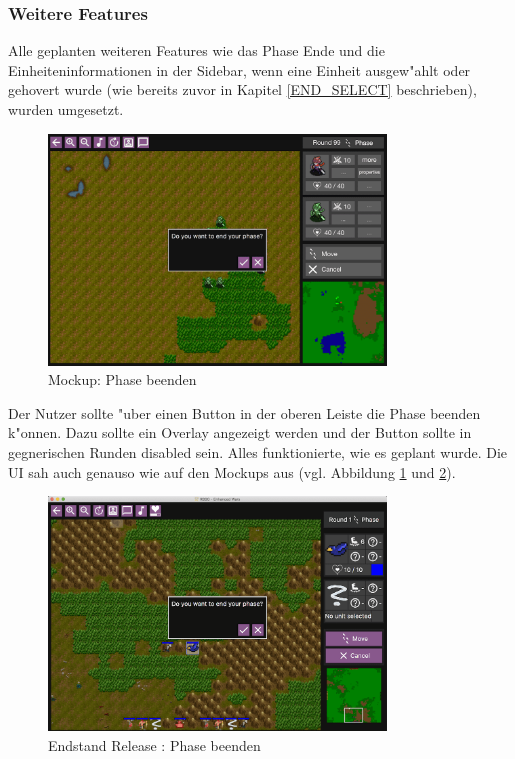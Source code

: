 \documentclass[12pt, titlepage]{scrartcl}
\newcommand{\RN}[1]{%
	\textup{\uppercase\expandafter{\romannumeral#1}}%
}
\newcounter{subsubsubsection}[subsubsection]
\begin{document}
			\subsubsection{Weitere Features}
				Alle geplanten weiteren Features wie das Phase Ende und die Einheiteninformationen in der Sidebar, wenn eine Einheit ausgew"ahlt oder gehovert wurde (wie bereits zuvor in Kapitel \ref{END_SELECT} beschrieben), wurden umgesetzt.
				\begin{figure}[H] 
					\centering
					\includegraphics[width=0.8\textwidth]{images/mockups/EndPhase.png}
					\caption{Mockup: Phase beenden}
					\label{Phase_End_2}
				\end{figure}
					Der Nutzer sollte "uber einen Button in der oberen Leiste die Phase beenden k"onnen. Dazu sollte ein Overlay angezeigt werden und der Button sollte in gegnerischen Runden disabled sein. Alles funktionierte, wie es geplant wurde. Die UI sah auch genauso wie auf den Mockups aus (vgl. Abbildung \ref{Phase_End_2} und \ref{End_Phase_End}).
					\begin{figure}[H] 
						\centering
						\includegraphics[width=0.8\textwidth]{images/endOfRelease/EndPhase.png}
						\caption{Endstand Release \RN{3}: Phase beenden}
						\label{End_Phase_End}
					\end{figure}
\end{document}
